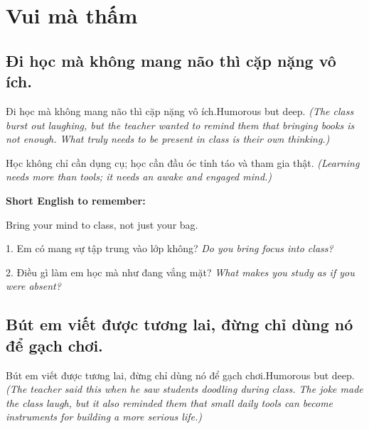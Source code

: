 \chapter{Vui mà thấm}

\section{Đi học mà không mang não thì cặp nặng vô ích.}
\begin{truyen}{Đi học mà không mang não thì cặp nặng vô ích.}{Humorous but deep.}
\textit{(The class burst out laughing, but the teacher wanted to remind them that bringing books is not enough. What truly needs to be present in class is their own thinking.)}
\end{truyen}

\begin{baihoc}
Học không chỉ cần dụng cụ; học cần đầu óc tỉnh táo và tham gia thật.
\textit{(Learning needs more than tools; it needs an awake and engaged mind.)}
\end{baihoc}

\begin{ghinhoanh}
\textbf{Short English to remember:}

Bring your mind to class, not just your bag.

\end{ghinhoanh}

\begin{tuhocnhanh}
1. Em có mang sự tập trung vào lớp không? \textit{Do you bring focus into class?}

2. Điều gì làm em học mà như đang vắng mặt? \textit{What makes you study as if you were absent?}
\end{tuhocnhanh}
\ngancach

\section{Bút em viết được tương lai, đừng chỉ dùng nó để gạch chơi.}
\begin{truyen}{Bút em viết được tương lai, đừng chỉ dùng nó để gạch chơi.}{Humorous but deep.}
\textit{(The teacher said this when he saw students doodling during class. The joke made the class laugh, but it also reminded them that small daily tools can become instruments for building a more serious life.)}
\end{truyen}


